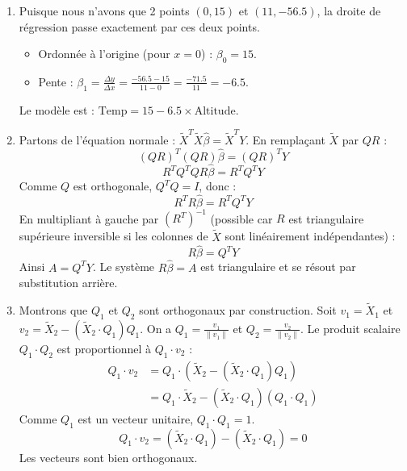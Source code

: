 \documentclass[solutions]{../exercices}
\begin{document}
\begin{solution}
    \begin{enumerate}
        \item Puisque nous n'avons que 2 points $(0, 15)$ et $(11, -56.5)$, la droite de régression passe exactement par ces deux points.
        \begin{itemize}
            \item Ordonnée à l'origine (pour $x=0$) : $\beta_0 = 15$.
            \item Pente : $\beta_1 = \frac{\Delta y}{\Delta x} = \frac{-56.5 - 15}{11 - 0} = \frac{-71.5}{11} = -6.5$.
        \end{itemize}
        Le modèle est : $\text{Temp} = 15 - 6.5 \times \text{Altitude}$.

        \item Partons de l'équation normale : $\tilde{X}^T \tilde{X} \hat{\beta} = \tilde{X}^T Y$.
        En remplaçant $\tilde{X}$ par $QR$ :
        \[ (QR)^T (QR) \hat{\beta} = (QR)^T Y \]
        \[ R^T Q^T Q R \hat{\beta} = R^T Q^T Y \]
        Comme $Q$ est orthogonale, $Q^T Q = I$, donc :
        \[ R^T R \hat{\beta} = R^T Q^T Y \]
        En multipliant à gauche par $(R^T)^{-1}$ (possible car $R$ est triangulaire supérieure inversible si les colonnes de $\tilde{X}$ sont linéairement indépendantes) :
        \[ R \hat{\beta} = Q^T Y \]
        Ainsi $A = Q^T Y$. Le système $R \hat{\beta} = A$ est triangulaire et se résout par substitution arrière.

        \item Montrons que $Q_1$ et $Q_2$ sont orthogonaux par construction.
        Soit $v_1 = \tilde{X}_1$ et $v_2 = \tilde{X}_2 - (\tilde{X}_2 \cdot Q_1) Q_1$.
        On a $Q_1 = \frac{v_1}{\|v_1\|}$ et $Q_2 = \frac{v_2}{\|v_2\|}$.
        Le produit scalaire $Q_1 \cdot Q_2$ est proportionnel à $Q_1 \cdot v_2$ :
        \begin{align*}
            Q_1 \cdot v_2 &= Q_1 \cdot (\tilde{X}_2 - (\tilde{X}_2 \cdot Q_1) Q_1) \\
            &= Q_1 \cdot \tilde{X}_2 - (\tilde{X}_2 \cdot Q_1) (Q_1 \cdot Q_1)
        \end{align*}
        Comme $Q_1$ est un vecteur unitaire, $Q_1 \cdot Q_1 = 1$.
        \[ Q_1 \cdot v_2 = (\tilde{X}_2 \cdot Q_1) - (\tilde{X}_2 \cdot Q_1) = 0 \]
        Les vecteurs sont bien orthogonaux.


\end{enumerate}
\end{solution}
\end{document}
